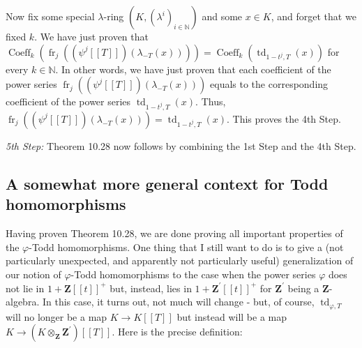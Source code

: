 \documentclass[numbers=enddot,12pt,final,onecolumn,notitlepage]{scrartcl}%
\begin{document}
Now fix some special $\lambda$-ring $\left(  K,\left(  \lambda^{i}\right)
_{i\in\mathbb{N}}\right)  $ and some $x\in K$, and forget that we fixed $k$.
We have just proven that $\operatorname*{Coeff}\nolimits_{k}\left(
\operatorname*{fr}\nolimits_{j}\left(  \left(  \psi^{j}\left[  \left[
T\right]  \right]  \right)  \left(  \lambda_{-T}\left(  x\right)  \right)
\right)  \right)  =\operatorname*{Coeff}\nolimits_{k}\left(
\operatorname*{td}\nolimits_{1-t^{j},T}\left(  x\right)  \right)  $ for every
$k\in\mathbb{N}$. In other words, we have just proven that each coefficient of
the power series $\operatorname*{fr}\nolimits_{j}\left(  \left(  \psi
^{j}\left[  \left[  T\right]  \right]  \right)  \left(  \lambda_{-T}\left(
x\right)  \right)  \right)  $ equals to the corresponding coefficient of the
power series $\operatorname*{td}\nolimits_{1-t^{j},T}\left(  x\right)  $.
Thus, $\operatorname*{fr}\nolimits_{j}\left(  \left(  \psi^{j}\left[  \left[
T\right]  \right]  \right)  \left(  \lambda_{-T}\left(  x\right)  \right)
\right)  =\operatorname*{td}\nolimits_{1-t^{j},T}\left(  x\right)  $. This
proves the 4th Step.

\textit{5th Step:} Theorem 10.28 now follows by combining the 1st Step and the
4th Step.

\subsection{A somewhat more general context for Todd homomorphisms}

Having proven Theorem 10.28, we are done proving all important properties of
the $\varphi$-Todd homomorphisms. One thing that I still want to do is to give
a (not particularly unexpected, and apparently not particularly useful)
generalization of our notion of $\varphi$-Todd homomorphisms to the case when
the power series $\varphi$ does not lie in $1+\mathbf{Z}\left[  \left[
t\right]  \right]  ^{+}$ but, instead, lies in $1+\mathbf{Z}^{\prime}\left[
\left[  t\right]  \right]  ^{+}$ for $\mathbf{Z}^{\prime}$ being a
$\mathbf{Z}$-algebra. In this case, it turns out, not much will change - but,
of course, $\operatorname*{td}\nolimits_{\varphi,T}$ will no longer be a map
$K\rightarrow K\left[  \left[  T\right]  \right]  $ but instead will be a map
$K\rightarrow\left(  K\otimes_{\mathbf{Z}}\mathbf{Z}^{\prime}\right)  \left[
\left[  T\right]  \right]  $. Here is the precise definition:
\end{document}
